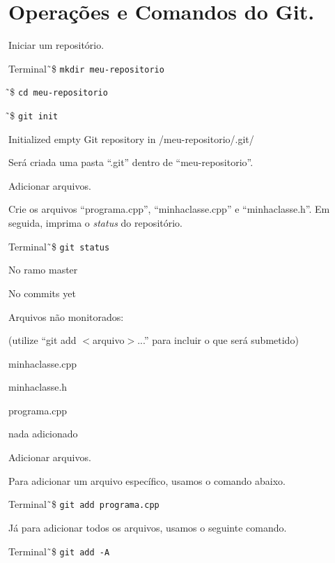 \documentclass[brazil,aspectratio=169]{beamer}
\newcommand{\terminal}[1]{\textcolor{my-green}{\texttt{#1}}}
\begin{document}
\section{Operações e Comandos do Git.}
\begin{frame}{Iniciar um repositório.}

\begin{exampleblock}{Terminal}
\~\,\$ \terminal{mkdir meu-repositorio}

\~\,\$ \terminal{cd meu-repositorio}

\~\,\$ \terminal{git init}

Initialized empty Git repository in /meu-repositorio/.git/

\end{exampleblock}

Será criada uma pasta ``.git'' dentro de ``meu-repositorio''.

\end{frame}

\begin{frame}{Adicionar arquivos.}

Crie os arquivos ``programa.cpp'', ``minhaclasse.cpp'' e ``minhaclasse.h''. Em seguida, imprima o \textit{status}
do repositório.

\begin{exampleblock}{Terminal}
\~\,\$ \terminal{git status}

No ramo master

No commits yet

Arquivos não monitorados:

  (utilize ``git add $<$arquivo$>$...'' para incluir o que será submetido)
  
	minhaclasse.cpp
	
	minhaclasse.h
	
	programa.cpp

nada adicionado 
\end{exampleblock}
\end{frame}

\begin{frame}{Adicionar arquivos.}

Para adicionar um arquivo específico, usamos o comando abaixo.

\begin{exampleblock}{Terminal}
\~\,\$ \terminal{git add programa.cpp}
\end{exampleblock}

Já para adicionar todos os arquivos, usamos o seguinte comando.

\begin{exampleblock}{Terminal}
\~\,\$ \terminal{git add -A}
\end{exampleblock}
\end{frame}
\end{document}
